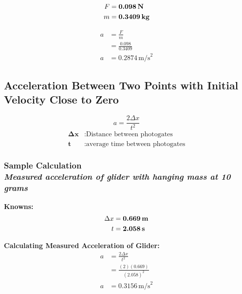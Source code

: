 {\centering
{}
\begin{align*}
	F &= \boldsymbol{0.098\,\text{\textbf{N}}} \\
	m &= \boldsymbol{0.3409\,\text{\textbf{kg}}}
\end{align*}

\begin{align*}
	a &= \frac{F}{m} \\
	&= \frac{0.098}{0.3409} \\
	a &= \boxed{0.2874\,\text{m/s}^2}
\end{align*}}


\newpage

\subsection{Acceleration Between Two Points with Initial Velocity Close to Zero} 

{\centering
\begin{equation}
	a = \frac{2\Delta{x}}{t^2} 
	\label{eq:MeasuredAcc}
\end{equation}
\begin{align*}
	\boldsymbol{\Delta{x}} &: \text{Distance between photogates} \\
\boldsymbol{t} &: \text{average time between photogates}
\end{align*}}

\subsubsection{Sample Calculation \\ {\normalfont \small\textit{Measured acceleration of glider with hanging mass at 10 grams}}}

{\centering
\textbf{Knowns:}
\begin{align*}
	\Delta{x} &= \boldsymbol{0.669\,\text{\textbf{m}}} \\
	t &= \boldsymbol{2.058\,\text{\textbf{s}}}
\end{align*}

\textbf{Calculating Measured Acceleration of Glider:}
\begin{align*}
	a &= \frac{2\Delta{x}}{t^2} \\
	&= \frac{(2)(0.669)}{(2.058)^2} \\
	a &= \boxed{0.3156\,\text{m/s}^2}
\end{align*}}

